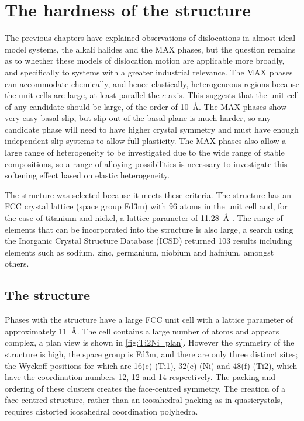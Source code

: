 

\chapter{\texorpdfstring{The hardness of the  structure}{The hardness of the Ti2Ni structure}}
\graphicspath{{hardness_of_ti_2_ni/Figs/}}
\label{chap:ti2ni_hardness}



The previous chapters have explained observations of dislocations in almost ideal model systems, the alkali halides and the MAX phases, but the question remains as to whether these models of dislocation motion are applicable more broadly, and specifically to systems with a greater industrial relevance. The MAX phases can accommodate chemically, and hence elastically, heterogeneous regions because the unit cells are large, at least parallel the $c$ axis. This suggests that the unit cell of any candidate should be large, of the order of \SI{10}{\angstrom}. The MAX phases show very easy basal slip, but slip out of the basal plane is much harder, so any candidate phase will need to have higher crystal symmetry and must have enough independent slip systems to allow full plasticity. The MAX phases also allow a large range of heterogeneity to be investigated due to the wide range of stable compositions, so a range of alloying possibilities is necessary to investigate this softening effect based on elastic heterogeneity.

The  structure was selected because it meets these criteria. The structure has an FCC crystal lattice (space group Fd\={3}m) with 96 atoms in the unit cell and, for the case of titanium and nickel, a lattice parameter of \SI{11.28}{\angstrom} \cite{Yurko1959,Yurko1962}. The range of elements that can be incorporated into the structure is also large, a search using the Inorganic Crystal Structure Database (ICSD) \cite{ICSD} returned 103 results including elements such as sodium, zinc, germanium, niobium and hafnium, amongst others.

\section{The \texorpdfstring{}{Ti2Ni} structure}
\FloatBarrier


Phases with the  structure have a large FCC unit cell with a lattice parameter of approximately \SI{11}{\angstrom}. The cell contains  a large number of atoms and appears complex, a plan view is shown in \autoref{fig:Ti2Ni_plan}. However the symmetry of the structure is high, the space group is Fd\={3}m, and there are only three distinct sites; the Wyckoff positions for which are 16(c) (Ti1), 32(e) (Ni) and 48(f) (Ti2), which have the coordination numbers 12, 12 and 14 respectively. The packing and ordering of these clusters creates the face-centred symmetry. The creation of a face-centred structure, rather than an icosahedral packing as in quasicrystals, requires distorted icosahedral coordination polyhedra.


